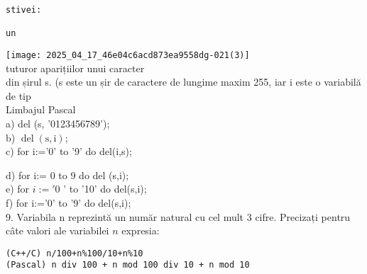 \begin{verbatim}

\end{verbatim}

\begin{verbatim}
stivei:
                                                                                                                    un
\end{verbatim}

\texttt{[image: 2025\_04\_17\_46e04c6acd873ea9558dg-021(3)]}\\
tuturor aparițiilor unui caracter\\
din șirul s. (s este un șir de caractere de lungime maxim 255, iar i este o variabilă de tip\\
Limbajul Pascal\\
a) del (s, '0123456789');\\
b) $\operatorname{del}(\mathrm{s}, \mathrm{i})$;\\
c) for i:='0' to '9' do del(i,s);

d) for i:= 0 to 9 do del (s,i);\\
e) for $i:=' 0$ ' to '10' do del(s,i);\\
f) for i:='0' to '9' do del(s,i);\\
9. Variabila n reprezintă un număr natural cu cel mult 3 cifre. Precizați pentru câte valori ale variabilei $n$ expresia:

\begin{verbatim}
(C++/C) n/100+n%100/10+n%10
(Pascal) n div 100 + n mod 100 div 10 + n mod 10
\end{verbatim}

